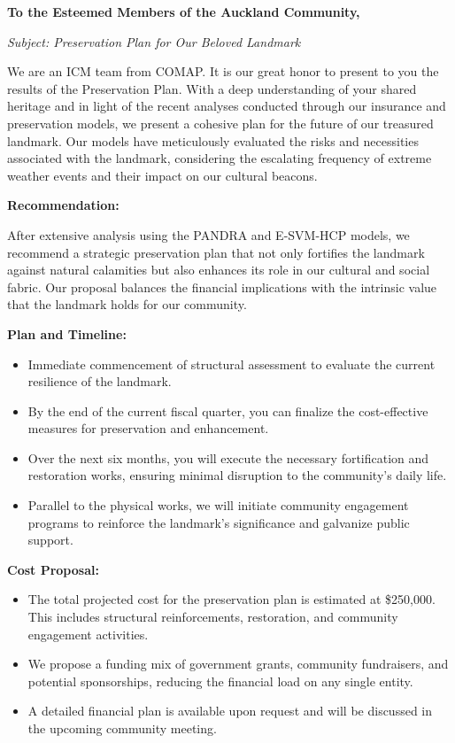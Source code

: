 \documentclass{mcmthesis}
\begin{document}
\begin{letter}{}

    \textbf{To the Esteemed Members of the Auckland Community,}
    
    \textit{Subject: Preservation Plan for Our Beloved Landmark}
    
    We are an ICM team from COMAP. It is our great honor to present to you the results of the Preservation Plan. With a deep understanding of your shared heritage and in light of the recent analyses conducted through our insurance and preservation models, we present a cohesive plan for the future of our treasured landmark. Our models have meticulously evaluated the risks and necessities associated with the landmark, considering the escalating frequency of extreme weather events and their impact on our cultural beacons.
    
    \textbf{Recommendation:}
    
    After extensive analysis using the PANDRA and E-SVM-HCP models, we recommend a strategic preservation plan that not only fortifies the landmark against natural calamities but also enhances its role in our cultural and social fabric. Our proposal balances the financial implications with the intrinsic value that the landmark holds for our community.
    
    \textbf{Plan and Timeline:}
    
    \begin{itemize}
      \item Immediate commencement of structural assessment to evaluate the current resilience of the landmark.
      \item By the end of the current fiscal quarter, you can finalize the cost-effective measures for preservation and enhancement.
      \item Over the next six months, you will execute the necessary fortification and restoration works, ensuring minimal disruption to the community's daily life.
      \item Parallel to the physical works, we will initiate community engagement programs to reinforce the landmark’s significance and galvanize public support.
    \end{itemize}
    
    \textbf{Cost Proposal:}
    
    \begin{itemize}
      \item The total projected cost for the preservation plan is estimated at \$250,000. This includes structural reinforcements, restoration, and community engagement activities.
      \item We propose a funding mix of government grants, community fundraisers, and potential sponsorships, reducing the financial load on any single entity.
      \item A detailed financial plan is available upon request and will be discussed in the upcoming community meeting.
    \end{itemize}
    

\end{letter}
\end{document}
